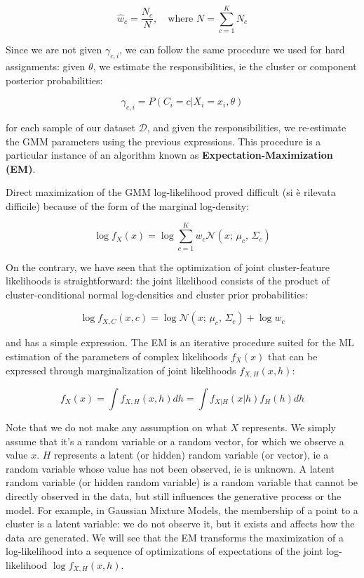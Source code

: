 \begin{equation*}
\hat{w}_c = \frac{N_c}{N}, \quad \text{where } N = \sum_{c=1}^K N_c
\end{equation*}

Since we are not given $\gamma_{c,i}$, we can follow the same procedure we used for hard assignments: given $\theta$, we estimate the responsibilities, ie the cluster or component posterior probabilities:


\begin{equation*}
\gamma_{c,i} = P(C_i = c | X_i = x_i, \theta)
\end{equation*}

for each sample of our dataset $\mathcal{D}$, and given the responsibilities, we re-estimate the GMM parameters using the previous expressions. This procedure is a particular instance of an algorithm known as \textbf{Expectation-Maximization (EM)}.

Direct maximization of the GMM log-likelihood proved difficult (si è rilevata difficile) because of the form of the marginal log-density:


\begin{equation*}
\log f_X(x) = \log \sum_{c=1}^K w_c \mathcal{N}(x;\, \mu_c,\, \Sigma_c)
\end{equation*}

On the contrary, we have seen that the optimization of joint cluster-feature likelihoods is straightforward: the joint likelihood consists of the product of cluster-conditional normal log-densities and cluster prior probabilities:


\begin{equation*}
\log f_{X,C}(x, c) = \log \mathcal{N}(x;\, \mu_c,\, \Sigma_c) + \log w_c
\end{equation*}

and has a simple expression. The EM is an iterative procedure suited for the ML estimation of the parameters of complex likelihoods $f_X(x)$ that can be expressed through marginalization of joint likelihoods $f_{X,H}(x,h)$:


\begin{equation*}
f_X(x) = \int f_{X,H}(x,h) dh = \int f_{X|H}(x|h) f_H(h) dh
\end{equation*}

Note that we do not make any assumption on what $X$ represents. We simply assume that it's a random variable or a random vector, for which we observe a value $x$. $H$ represents a latent (or hidden) random variable (or vector), ie a random variable whose value has not been observed, ie is unknown. A latent random variable (or hidden random variable) is a random variable that cannot be directly observed in the data, but still influences the generative process or the model. For example, in Gaussian Mixture Models, the membership of a point to a cluster is a latent variable: we do not observe it, but it exists and affects how the data are generated. We will see that the EM transforms the maximization of a log-likelihood into a sequence of optimizations of expectations of the joint log-likelihood $\log f_{X,H}(x,h)$.

